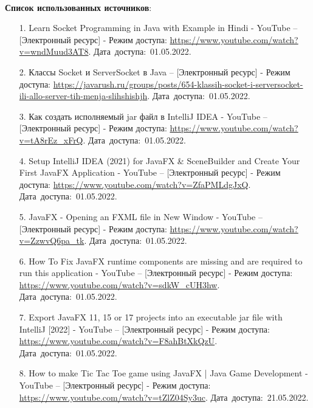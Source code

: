 \documentclass[12pt, a4paper, simple]{eskdtext}
\begin{document}
    \paragraph{} \textbf{Список использованных источников}:
    \begin{enumerate}
        \item[1.] Learn Socket Programming in Java with Example in Hindi - YouTube -- [Электронный ресурс]
        - Режим доступа: \url{https://www.youtube.com/watch?v=wndMuud3AT8}.
        Дата~доступа:~01.05.2022.
        \item[2.] Классы Socket и ServerSocket в Java -- [Электронный ресурс]
        - Режим доступа: \url{https://javarush.ru/groups/posts/654-klassih-socket-i-serversocket-ili-allo-server-tih-menja-slihshishjh}.
        Дата~доступа:~01.05.2022.
        \item[3.] Как создать исполняемый jar файл в IntelliJ IDEA - YouTube -- [Электронный ресурс]
        - Режим доступа: \url{https://www.youtube.com/watch?v=tA8rEz_xFrQ}.
        Дата~доступа:~01.05.2022.
        \item[4.] Setup IntelliJ IDEA (2021) for JavaFX \& SceneBuilder and Create Your First JavaFX Application - YouTube -- [Электронный ресурс]
        - Режим доступа: \url{https://www.youtube.com/watch?v=ZfaPMLdgJxQ}.
        Дата~доступа:~01.05.2022.
        \item[5.] JavaFX - Opening an FXML file in New Window - YouTube -- [Электронный ресурс]
        - Режим доступа: \url{https://www.youtube.com/watch?v=ZzwvQ6pa_tk}.
        Дата~доступа:~01.05.2022.
        \item[6.] How To Fix JavaFX runtime components are missing and are required to run this application - YouTube -- [Электронный ресурс]
        - Режим доступа: \url{https://www.youtube.com/watch?v=sdkW_cUH3hw}.
        Дата~доступа:~01.05.2022.
        \item[7.] Export JavaFX 11, 15 or 17 projects into an executable jar file with IntelliJ [2022] - YouTube -- [Электронный ресурс]
        - Режим доступа: \url{https://www.youtube.com/watch?v=F8ahBtXkQzU}.
        Дата~доступа:~01.05.2022.
        \item[8.] How to make Tic Tac Toe game using JavaFX | Java Game Development - YouTube -- [Электронный ресурс]
        - Режим доступа: \url{https://www.youtube.com/watch?v=tZlZ04Sy3uc}.
        Дата~доступа:~21.05.2022.
    \end{enumerate}
    \newpage
\end{document}
